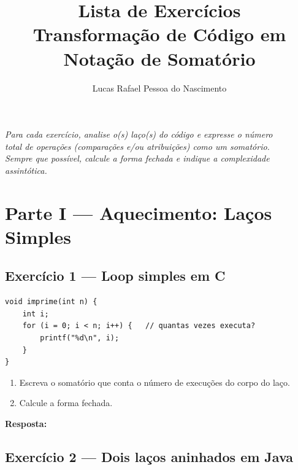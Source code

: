 \documentclass[12pt, a4paper]{article}
\title{\textbf{Lista de Exercícios}\\[6pt]
       \large Transformação de Código em Notação de Somatório}
\author{Lucas Rafael Pessoa do Nascimento}
\date{}
\newenvironment{resposta}{%
    \begin{mdframed}[linecolor=black!30, backgroundcolor=white,
                     innertopmargin=10pt, innerbottommargin=30pt,
                     skipabove=6pt]
    \textbf{Resposta:}\\[4pt]
}{%
    \end{mdframed}
}
\begin{document}
\maketitle

\begin{center}
    \textit{Para cada exercício, analise o(s) laço(s) do código e expresse o número\\
    total de operações (comparações e/ou atribuições) como um somatório.\\
    Sempre que possível, calcule a forma fechada e indique a complexidade assintótica.}
\end{center}

\bigskip

\section*{Parte I — Aquecimento: Laços Simples}

\subsection*{Exercício 1 — Loop simples em C}

\begin{lstlisting}[style=cstyle]
void imprime(int n) {
    int i;
    for (i = 0; i < n; i++) {   // quantas vezes executa?
        printf("%d\n", i);
    }
}
\end{lstlisting}

\begin{enumerate}[label=(\alph*)]
    \item Escreva o somatório que conta o número de execuções do corpo do laço.
    \item Calcule a forma fechada.
\end{enumerate}

\begin{resposta}
\vspace{3cm}
\end{resposta}

\subsection*{Exercício 2 — Dois laços aninhados em Java}
\end{document}
